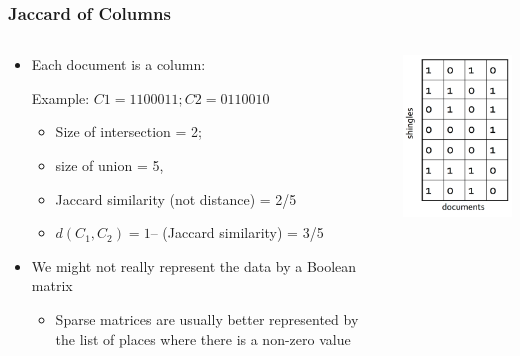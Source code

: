 \documentclass[svgnames]{beamer}
\begin{document}
\begin{frame} \frametitle{Jaccard of Columns}

 \begin{columns}[T]
    \begin{column}{0.5\textwidth}
\begin{itemize}
\item Each document is a column:

  {\scriptsize
  \begin{block}{Example: $C1 = 1100011; C2 = 0110010$}
  \scriptsize
  \begin{itemize}
  \scriptsize
  \item Size of intersection = 2; 
  \item size of union = 5, 
  \item Jaccard similarity (not distance) = 2/5
  \item $d(C_1,C_2) = 1 –$ (Jaccard similarity) = 3/5
  \end{itemize}
  \end{block}}  

\item We might not really represent the data by a Boolean matrix
  \begin{itemize}
  \item Sparse matrices are usually better represented by the list of places where there is a non-zero value
  \end{itemize}
\end{itemize}
  \end{column}
  \begin{column}{0.5\textwidth}
   \includegraphics[width=5cm]{matrix}
  \end{column}
 \end{columns}

\end{frame}
\end{document}
